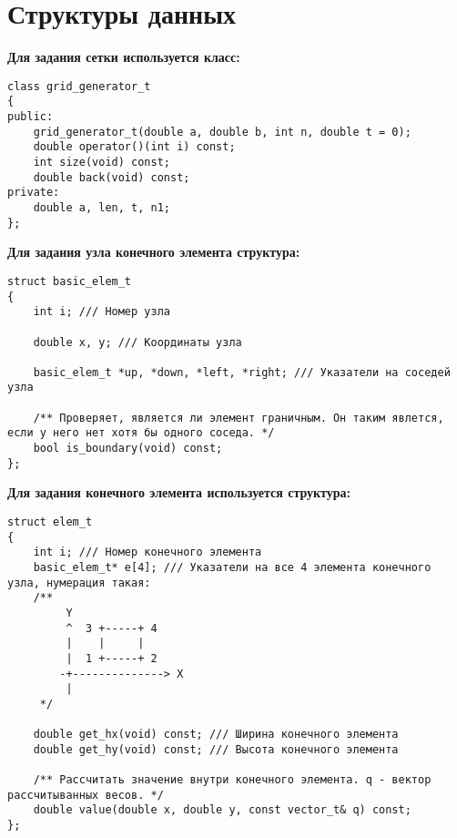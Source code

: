 \section{Структуры данных}

\noindent\textbf{Для задания сетки используется класс:}

\begin{verbatim}
class grid_generator_t
{
public:
	grid_generator_t(double a, double b, int n, double t = 0);
	double operator()(int i) const;
	int size(void) const;
	double back(void) const;
private:
	double a, len, t, n1;
};
\end{verbatim}

\noindent\textbf{Для задания узла конечного элемента структура:}

\begin{verbatim}
struct basic_elem_t
{
	int i; /// Номер узла

	double x, y; /// Координаты узла

	basic_elem_t *up, *down, *left, *right; /// Указатели на соседей узла

	/** Проверяет, является ли элемент граничным. Он таким явлется, если у него нет хотя бы одного соседа. */
	bool is_boundary(void) const;
};
\end{verbatim}

\noindent\textbf{Для задания конечного элемента используется структура:}

\begin{verbatim}
struct elem_t
{
	int i; /// Номер конечного элемента
	basic_elem_t* e[4]; /// Указатели на все 4 элемента конечного узла, нумерация такая:
	/** 
		 Y
		 ^  3 +-----+ 4
		 |    |     |
		 |  1 +-----+ 2
		-+--------------> X
		 |
	 */

	double get_hx(void) const; /// Ширина конечного элемента
	double get_hy(void) const; /// Высота конечного элемента

	/** Рассчитать значение внутри конечного элемента. q - вектор рассчитыванных весов. */
	double value(double x, double y, const vector_t& q) const;
};
\end{verbatim}

